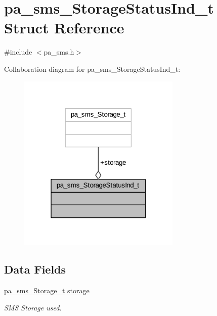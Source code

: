 \hypertarget{structpa__sms___storage_status_ind__t}{}\section{pa\+\_\+sms\+\_\+\+Storage\+Status\+Ind\+\_\+t Struct Reference}
\label{structpa__sms___storage_status_ind__t}


{\ttfamily \#include $<$pa\+\_\+sms.\+h$>$}



Collaboration diagram for pa\+\_\+sms\+\_\+\+Storage\+Status\+Ind\+\_\+t\+:
\nopagebreak
\begin{figure}[H]
\begin{center}
\leavevmode
\includegraphics[width=220pt]{structpa__sms___storage_status_ind__t__coll__graph}
\end{center}
\end{figure}
\subsection*{Data Fields}
\begin{DoxyCompactItemize}
\item 
\hyperlink{pa__sms_8h_a12db350a7e9630c84a3956cfb7a698da}{pa\+\_\+sms\+\_\+\+Storage\+\_\+t} \hyperlink{structpa__sms___storage_status_ind__t_ae72a0c32f5bbad1b1f88fc51812c6164}{storage}
\begin{DoxyCompactList}\small\item\em S\+MS Storage used. \end{DoxyCompactList}\end{DoxyCompactItemize}


